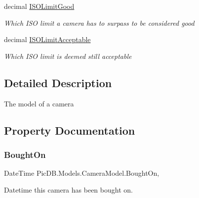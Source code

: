 \begin{DoxyCompactItemize}
decimal \mbox{\hyperlink{class_pic_d_b_1_1_models_1_1_camera_model_a2131f8ede10d20d95d3c2c9bb18bcfa6}{I\+S\+O\+Limit\+Good}}
\begin{DoxyCompactList}\small\item\em Which I\+SO limit a camera has to surpass to be considered good \end{DoxyCompactList}\item 
decimal \mbox{\hyperlink{class_pic_d_b_1_1_models_1_1_camera_model_af5e0a52cbf9dc9f294c302b0525802ac}{I\+S\+O\+Limit\+Acceptable}}
\begin{DoxyCompactList}\small\item\em Which I\+SO limit is deemed still acceptable \end{DoxyCompactList}\end{DoxyCompactItemize}


\subsection{Detailed Description}
The model of a camera 



\subsection{Property Documentation}
\mbox{\label{class_pic_d_b_1_1_models_1_1_camera_model_a553208926883eeab6ef3b58d031e480c}} 
\subsubsection{\texorpdfstring{Bought\+On}{BoughtOn}}
{\footnotesize\ttfamily Date\+Time Pic\+D\+B.\+Models.\+Camera\+Model.\+Bought\+On\hspace{0.3cm}{\ttfamily [get]}, {\ttfamily [set]}}



Datetime this camera has been bought on. 

\mbox{\label{class_pic_d_b_1_1_models_1_1_camera_model_a31394a505a536d6c692e4fc4b76213f4}} 
